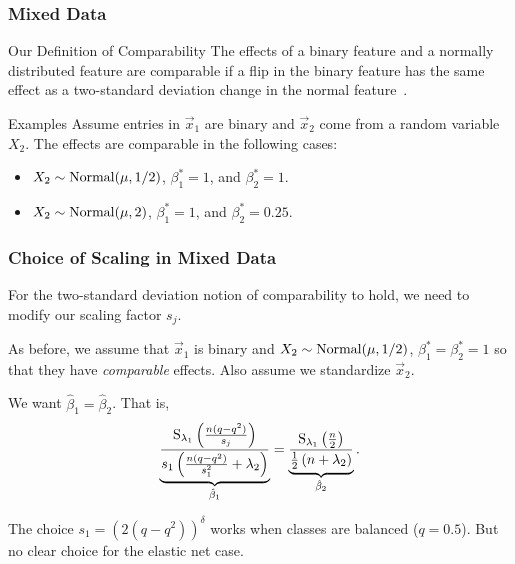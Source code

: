 \documentclass[aspectratio=1610,onlytextwidth]{beamer}
\begin{document}
\begin{frame}[c]
  \frametitle{Mixed Data}

  \begin{block}{Our Definition of Comparability}
    The effects of a binary feature and a normally distributed feature are \alert{comparable} if a flip in the binary feature has the same effect as a two-standard deviation change in the normal feature~\citep{gelman2008}.
  \end{block}

  \pause

  \begin{exampleblock}{Examples}
    Assume entries in \(\vec{x}_1\) are binary and \(\vec{x}_2\) come from a random variable \(X_2\). The effects are comparable in the following cases:
    \begin{itemize}
      \item \(X_2 \sim \operatorname{Normal}(\mu, 1/2)\), \(\beta_1^* = 1\), and \(\beta_2^* = 1\).
      \item \(X_2 \sim \operatorname{Normal}(\mu, 2)\), \(\beta_1^* = 1\), and \(\beta_2^* = 0.25\).
    \end{itemize}
  \end{exampleblock}
\end{frame}

\begin{frame}[c]
  \frametitle{Choice of Scaling in Mixed Data}

  For the two-standard deviation notion of comparability to hold, we need to modify our
  scaling factor \(s_j\).

  \bigskip\pause

  As before, we assume that \(\vec{x}_1\) is binary and \(X_2 \sim \operatorname{Normal}(\mu, 1/2)\),
  \(\beta_1^* = \beta_2^* = 1\) so that they have \emph{comparable} effects. Also assume we
  standardize \(\vec{x}_2\).

  \medskip

  We want \(\hat{\beta}_1 = \hat{\beta}_2\). That is,
  \[
    \underbrace{\frac{\operatorname{S}_{\lambda_1}\left(\frac{n (q - q^2)}{s_j}\right)}{s_1\left(\frac{n(q - q^2)}{s_1^2} + \lambda_2\right)}}_{\hat{\beta}_1}  = \underbrace{\frac{\operatorname{S}_{\lambda_1}\left(\frac{n}{2}\right)}{\frac{1}{2}\left(n + \lambda_2\right)}}_{\hat{\beta}_2}.
  \]

  \medskip\pause

  The choice \(s_1 = (2 (q - q^2))^\delta\) works when classes are balanced (\(q = 0.5\)).
  But no clear choice for the elastic net case.
\end{frame}
\end{document}
